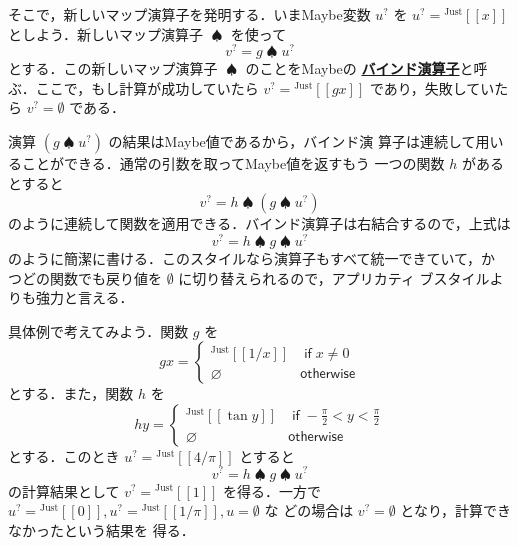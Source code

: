 \documentclass[a5paper,twoside,fleqn]{jsbook}
\def\[{\left[\!\left[}
\def\]{\right]\!\right]}
\newcommand{\keyword}[1]{{\underline{\textbf{#1}}}}
\newcommand{\mKeyword}[1]{\mathsf{#1}} %
\newcommand{\mIfKeyword}{\mKeyword{if}}
\newcommand{\mOtherwiseKeyword}{\mKeyword{otherwise}}
\DeclareMathOperator{\mIf}{\mIfKeyword}
\DeclareMathOperator{\mOtherwise}{\mOtherwiseKeyword}
\newcommand{\mNothing}{\emptyset}
\newcommand{\mPureNothing}{\varnothing}
\DeclareMathOperator{\mBindMaybe}{\spadesuit}
\newcommand{\mGenericValueConstructor}[1]{\mathrm{#1}}
\newcommand{\mGenericWith}[2]{{}^\mGenericValueConstructor{#1}\[#2\]}
\newcommand{\mJustWith}[1]{\mGenericWith{Just}{#1}}
\newcommand{\mMaybe}[1]{{#1}^?}
\begin{document}

そこで，新しいマップ演算子を発明する．いまMaybe変数 $\mMaybe{u}$ を
$\mMaybe{u}=\mJustWith{x}$ としよう．新しいマップ演算子 $\mBindMaybe$
を使って
\begin{equation}
\mMaybe{v}=g\mBindMaybe\mMaybe{u}
\end{equation}
とする．この新しいマップ演算子 $\mBindMaybe$ のことをMaybeの
\keyword{バインド演算子}と呼ぶ．ここで，もし計算が成功していたら
$\mMaybe{v}=\mJustWith{gx}$ であり，失敗していたら
$\mMaybe{v}=\mNothing$ である．

演算 $(g\mBindMaybe\mMaybe{u})$ の結果はMaybe値であるから，バインド演
算子は連続して用いることができる．通常の引数を取ってMaybe値を返すもう
一つの関数 $h$ があるとすると
\begin{equation}
\mMaybe{v}=h\mBindMaybe{}(g\mBindMaybe\mMaybe{u})
\end{equation}
のように連続して関数を適用できる．バインド演算子は右結合するので，上式は
\begin{equation}
\label{eq:maybe-z-bind-style}
\mMaybe{v}=h\mBindMaybe g\mBindMaybe\mMaybe{u}
\end{equation}
のように簡潔に書ける．このスタイルなら演算子もすべて統一できていて，か
つどの関数でも戻り値を $\mNothing$ に切り替えられるので，アプリカティ
ブスタイルよりも強力と言える．

具体例で考えてみよう．関数 $g$ を
\begin{equation}
gx=\begin{cases}
\mJustWith{1/x}&\mIf x\neq0\\
\mPureNothing&\mOtherwise
\end{cases}
\end{equation}
とする．また，関数 $h$ を
\begin{equation}
hy=\begin{cases}
\mJustWith{\tan y}&\mIf -\frac{\pi}{2}<y<\frac{\pi}{2}\\
\mPureNothing&\mOtherwise
\end{cases}
\end{equation}
とする．このとき $\mMaybe{u}=\mJustWith{4/\pi}$ とすると
\begin{equation}
\mMaybe{v}=h\mBindMaybe g\mBindMaybe\mMaybe{u}
\end{equation}
の計算結果として $\mMaybe{v}=\mJustWith{1}$ を得る．一方で
$\mMaybe{u}=\mJustWith{0},\mMaybe{u}=\mJustWith{1/\pi},u=\mNothing$ な
どの場合は $\mMaybe{v}=\mNothing$ となり，計算できなかったという結果を
得る．

\end{document}
